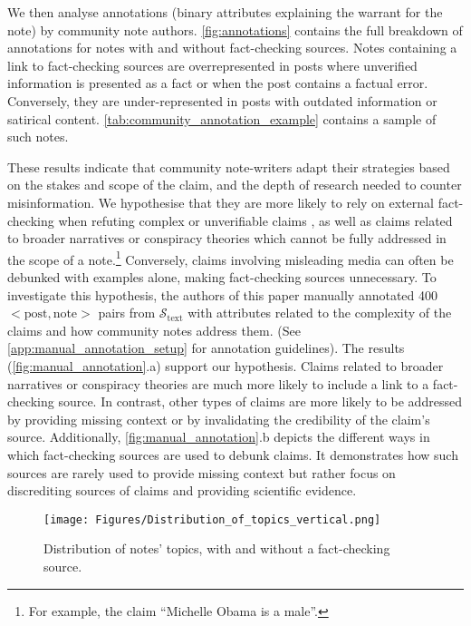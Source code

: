 We then analyse annotations (binary attributes explaining the warrant for the note) by community note authors.
\cref{fig:annotations} contains the full breakdown of annotations for notes with and without fact-checking sources. Notes containing a link to fact-checking sources are overrepresented in posts where unverified information is presented as a fact or when the post contains a factual error. Conversely, they are under-represented in posts with outdated information or satirical content. \cref{tab:community_annotation_example} contains a sample of such notes. 

These results indicate that community note-writers adapt their strategies based on the stakes and scope of the claim, and the depth of research needed to counter misinformation. We hypothesise that they are more likely to rely on external fact-checking when refuting complex or unverifiable claims \citep{wuehrl-etal-2024-makes}, as well as claims related to broader narratives or conspiracy theories which cannot be fully addressed in the scope of a note.\footnote{For example, the claim ``Michelle Obama is a male''.} Conversely, claims involving misleading media can often be debunked with examples alone, making fact-checking sources unnecessary. To investigate this hypothesis, the authors of this paper manually annotated 400 $<\text{post}, \text{note}>$ pairs from $\mathcal{S}_\text{text}$ with attributes related to the complexity of the claims and how community notes address them. (See \cref{app:manual_annotation_setup} for annotation guidelines). The results (\cref{fig:manual_annotation}.a) support our hypothesis. Claims related to broader narratives or conspiracy theories are much more likely to include a link to a fact-checking source.
In contrast, other types of claims are more likely to be addressed by providing missing context or by invalidating the credibility of the claim's source. 
Additionally, \cref{fig:manual_annotation}.b depicts the different ways in which fact-checking sources are used to debunk claims. It demonstrates how such sources are rarely used to provide missing context but rather focus on discrediting sources of claims and providing scientific evidence.

\begin{figure}[!t]
    \centering
    \texttt{[image: Figures/Distribution\_of\_topics\_vertical.png]}
    \caption{Distribution of notes' topics, with and without a fact-checking source.}
    \label{fig:topics}
\end{figure}

